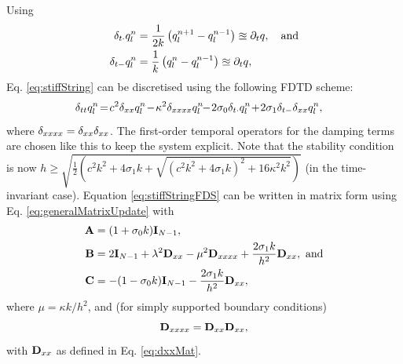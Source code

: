 \documentclass[fleqn]{jaes}
\begin{document}
Using
\begin{subequations}
\begin{align}
    \dtd \qln &= \frac{1}{2k}\left(q_l^{n+1} - q_l^{n-1}\right) \approxeq \pt q,\quad  \text{and}\\
     \dtm \qln &= \frac{1}{k}\left(\qln- q_l^{n-1}\right) \approxeq  \pt q,
\end{align}
\end{subequations}
Eq. \eqref{eq:stiffString} can be discretised using the following FDTD scheme:
\begin{equation}\label{eq:stiffStringFDS}
    \!\!\!\!\!\!\!\!\!\dtt \qln \!=\! c^2 \dxx \qln \!-\! \kappa^2 \dxxxx \qln\!\! -\! 2\sigma_0\dtd \qln\! +\! 2 \sigma_1 \dtm \dxx \qln,\!\!\!
\end{equation}
where $\delta_{xxxx} = \delta_{xx}\delta_{xx}$. The first-order temporal operators for the damping terms are chosen like this to keep the system explicit. Note that the stability condition is now $h\! \geq\! \sqrt{\tfrac{1}{2}\left(c^2k^2 + 4\sigma_1 k + \sqrt{(c^2k^2 + 4\sigma_1k)^2 +16\kappa^2k^2}\right)}$ (in the time-invariant case).
Equation \eqref{eq:stiffStringFDS} can be written in matrix form using Eq. \eqref{eq:generalMatrixUpdate} with 
\begin{equation}\label{eq:stiffStringMats}
\begin{aligned}
    \A &= (1 + \sigma_0k)\I_{N-1},\\ \B &= 2\I_{N-1} + \lambda^2 \Dxx - \mu^2 \Dxxxx + \frac{2\sigma_1k}{h^2}\Dxx, \  \text{and}\\
    \C &= -(1 - \sigma_0k)\I_{N-1} - \frac{2\sigma_1k}{h^2}\Dxx,
\end{aligned}
\end{equation}
where $\mu = \kappa k/h^2$, and (for simply supported boundary conditions)
\begin{equation}\label{eq:DxxxxMat}
    \Dxxxx = \Dxx\Dxx,
\end{equation}
with $\mathbf{D}_{xx}$ as defined in Eq. \eqref{eq:dxxMat}.
\end{document}
